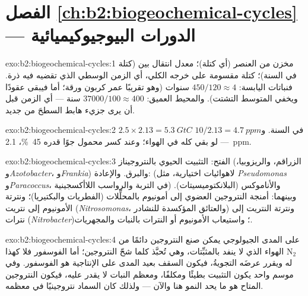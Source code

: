\section*{الفصل \ref{ch:b2:biogeochemical-cycles} --- الدورات البيوجيوكيميائية}

\begin{solution}{exo:b2:biogeochemical-cycles:1}
 مخزن من العنصر (أي كتلة)؛  معدل
انتقال بين  (كتلة في السنة)؛ 
كتلة  مقسومة على خرجه الكلي، أي الزمن الوسطي الذي
تقضيه فيه ذرة. فنباتات اليابسة: $450/120 \approx 4$ سنوات (وهو تقريبًا
عمر كربون ورقة؛ أما  فيبقى عقودًا ويخفي المتوسط
التشتت). والمحيط العميق: $37000/100 \approx 400$ سنة --- أي الزمن
قبل أن يرى جزيء هابط السطحَ من جديد.
\end{solution}

\begin{solution}{exo:b2:biogeochemical-cycles:2}
$2.5\times 2.13 = \qty{5.3}{GtC}$ في السنة. و$10/2.13 = \qty{4.7}{ppm}$
--- لو بقي كله في الهواء؛ وعند كسر محمول جوًا قدره \qty{45}{\%}،
\qty{2.1}{ppm}.
\end{solution}

\begin{solution}{exo:b2:biogeochemical-cycles:3}
\begingroup\sloppy
الفتح: التثبيت الحيوي بالنتروجيناز (الزراقم،
والريزوبيا، و\emph{Azotobacter}، و\emph{Frankia}) والبرق. والإعادة:
 (لاهوائيات اختيارية، مثل
\emph{Pseudomonas} و\emph{Paracoccus}، في التربة
والرواسب اللاأكسجينية) والأناموكس
(البلانكتوميسيتات). وبينهما: أمنجة النتروجين
العضوي إلى أمونيوم بالمحلِّلات (الفطريات
والبكتيريا)؛ ونترتة
الأمونيوم إلى نتريت (\emph{Nitrosomonas}، والعتائق
المؤكسدة للنشادر) ونترتة النتريت إلى نترات (\emph{Nitrobacter})؛
واستيعاب الأمونيوم أو النترات بالنبات والمجهريات.
\par\endgroup
\end{solution}

\begin{solution}{exo:b2:biogeochemical-cycles:4}
على المدى الجيولوجي يمكن صنع النتروجين دائمًا من
$\mathrm{N_2}$ الهواء الذي لا ينفد بالمثبِّتات، وهي تُحبَّذ
كلما شحّ النتروجين؛ أما الفوسفور فلا  كهذا له
ويقرر عرضَه التجويةُ، فيكون السقف بعيد المدى على
الإنتاجية هو الفوسفور. وفي موسم واحد يكون التثبيت بطيئًا
ومكلفًا، ومعظم النبات لا يقدر عليه، فيكون النتروجين المتاح
هو ما يحد النمو هنا والآن --- ولذلك كان السماد
نتروجينيًا في معظمه.
\end{solution}

